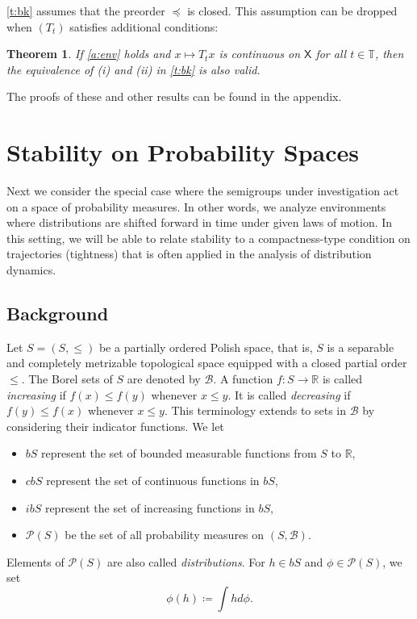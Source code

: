 \documentclass[12pt,reqno]{amsart}
\numberwithin{equation}{section}
\newtheorem{theorem}{Theorem}[section]
\theoremstyle{definition}
\newcommand{\1}{\mathbbm{1}}
\newcommand{\RR}{\mathbb{R}}
\newcommand{\TT}{\mathbb T}
\newcommand{\bB}{\mathscr{B}}
\newcommand{\pP}{\mathscr{P}}
\newcommand{\Xsf}{\mathsf{X}}
\newcommand{\navy}[1]{\textit{\textcolor{blue!40!black}{#1}}}
\begin{document}
\cref{t:bk} assumes that the preorder $\preceq$ is closed.  This
assumption can be dropped when $(T_t)$ satisfies additional conditions:

\begin{theorem}\label{t:bk2}
    If \cref{a:env} holds and $x \mapsto T_t x$ is
    continuous on $\Xsf$ for all $t \in \TT$, then the equivalence of {\rm (i)} and {\rm (ii)} in \cref{t:bk} is also valid.
\end{theorem}

The proofs of these and other results can be found in the appendix.





\section{Stability on Probability Spaces}\label{ss:md}

Next we consider the special case where the semigroups under investigation act
on a space of probability measures.  In other words, we analyze environments
where distributions are shifted forward in time under given laws of motion.
In this setting, we will be able to relate stability to a compactness-type
condition on trajectories (tightness) that is often applied in the analysis of
distribution dynamics.

\subsection{Background}

Let $S = (S, \leq)$ be a partially ordered
Polish space, that is, $S$ is a separable and completely metrizable topological
space equipped with a closed partial order $\leq$. The Borel sets of $S$ are denoted by $\bB$. A
function $f \colon S \to \RR$ is called \navy{increasing} if $f(x) \leq f(y)$
whenever $x \leq y$. It is called \navy{decreasing} if $f(y) \leq f(x)$ whenever
$x \leq y$.  This terminology extends to sets in $\bB$ by considering their
indicator functions. We let 
%
\begin{itemize}
    \item $bS$ represent the set of bounded measurable functions from $S$ to $\RR$, 
    \item $cbS$ represent the set of continuous functions in $bS$, 
    \item $ibS$ represent the set of increasing functions in $bS$, 
    \item $\pP(S)$ be the set of all probability measures on $(S, \bB)$.
\end{itemize}
%
Elements of $\pP(S)$ are also called \navy{distributions}.
For $h \in bS$ and $\phi \in \pP(S)$, we set
%
\begin{equation*}
    \phi(h) \coloneq \int h d \phi.    
\end{equation*}
%
\end{document}
